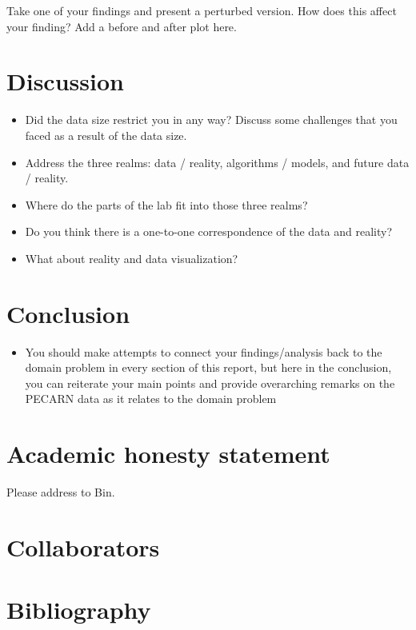 \documentclass[10pt,letterpaper]{article}
\begin{document}
Take one of your findings and present a perturbed version. How does this
affect your finding? Add a before and after plot here.

\section{Discussion}\label{discussion}

\begin{itemize}
\item Did the data size restrict you in any way? Discuss some challenges that you faced as a result of the data size.
\item Address the three realms: data / reality, algorithms / models, and future data / reality.
\item Where do the parts of the lab fit into those three realms?
\item Do you think there is a one-to-one correspondence of the data and reality?
\item What about reality and data visualization?
\end{itemize}


\section{Conclusion}\label{conclusion}

\begin{itemize}
\item You should make attempts to connect your findings/analysis back to the domain problem in every section of this report, but here in the conclusion, you can reiterate your main points and provide overarching remarks on the PECARN data as it relates to the domain problem
\end{itemize}

\section{Academic honesty statement}\label{academic-honesty-statement}

Please address to Bin.

\section{Collaborators}\label{collaborators}

\section{Bibliography}\label{bibliography}
\end{document}
